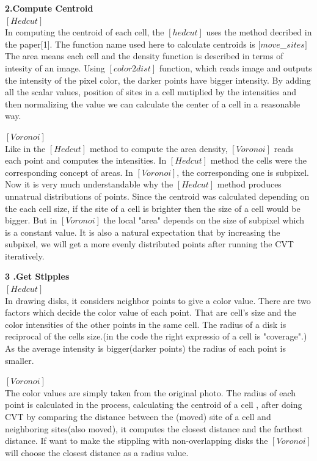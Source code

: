 \documentclass[11pt]{article}
\begin{document}
\textbf{2.Compute Centroid}\\
$[Hedcut]$\\
In computing the centroid of each cell, the $[hedcut]$ uses the method decribed in the paper[1]. The function name used here to calculate centroids is $[move$\_$sites]$ The area means each cell and the density function is described in  terms of intesity of an image. Using $[color2dist]$ function, which reads image and outputs the intensity of the pixel color, the darker points have bigger intensity. By adding all the scalar values, position of sites in a cell mutiplied by the intensities and then normalizing the value we can calculate the center of a cell in a reasonable way.

$[Voronoi]$\\
Like in the $[Hedcut]$ method to compute the area density, $[Voronoi]$ reads each point and computes the intensities. In $[Hedcut]$ method the cells were the corresponding concept of areas. In $[Voronoi]$, the corresponding one is subpixel. Now it is very much understandable why the $[Hedcut]$ method produces unnatrual distributions of points. Since the centroid was calculated depending on the each cell size, if the site of a cell is brighter then the size of a cell would be bigger. But in $[Voronoi]$ the local "area" depends on the size of subpixel which is a constant value. It is also a natural expectation that by increasing the subpixel, we will get a more  evenly distributed points after running the CVT iteratively.

\textbf{3 .Get Stipples}\\
$[Hedcut]$\\
In drawing disks, it considers neighbor points to give a color value. There are two factors which decide the color value of each point. That are cell's size and the color intensities of the other points in the same cell. The radius of a disk is reciprocal of the cells size.(in the code the right expressio of a cell is "coverage".)  As the average intensity is bigger(darker points) the radius of each point is smaller.

$[Voronoi]$\\
The color values are simply taken from the original photo. The radius of each point is calculated in the process, calculating the centroid of a cell , after doing CVT by comparing the distance between the (moved) site of a cell and neighboring sites(also moved), it computes the closest distance and the farthest distance. If want to make the stippling with non-overlapping disks the $[Voronoi]$ will choose the closest distance as a radius value.
\end{document}
